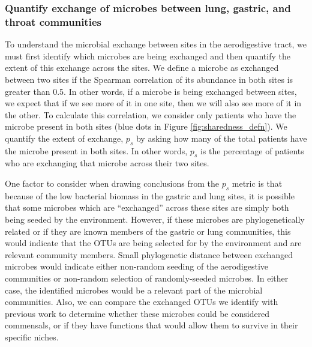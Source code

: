 \documentclass[12pt]{article}
\begin{document}
\subsubsection{Quantify exchange of microbes between lung, gastric, and throat communities} \label{sec:exchange}

To understand the microbial exchange between sites in the 
aerodigestive tract, we must first identify which microbes are being exchanged
and then quantify the extent of this exchange across the sites. 
We define a microbe as exchanged between two sites if the Spearman 
correlation of its abundance in both sites is greater than 0.5.
In other words, if a microbe is being exchanged between sites, we expect that if we see 
more of it in one site, then we will also see more of it in the other. 
To calculate this correlation, we consider only patients who have the microbe present in both sites (blue dots in Figure \ref{fig:sharedness_defn}).
We quantify the extent of exchange, $p_s$ by asking how many of the total patients
have the microbe present in both sites. In other words, $p_s$ is the 
percentage of patients who are exchanging that microbe across their two sites.

One factor to consider when drawing conclusions from the $p_s$ metric 
is that because of the low bacterial biomass in the gastric and lung 
sites, it is possible that some microbes which are ``exchanged'' across 
these sites are simply both being seeded by the environment. However, 
if these microbes are phylogenetically related or if they are known 
members of the gastric or lung communities, this would indicate that 
the OTUs are being selected for by the environment and are relevant 
community members. Small phylogenetic distance between exchanged microbes
would indicate either non-random seeding of the aerodigestive communities 
or non-random selection of randomly-seeded microbes. In either case, the
identified microbes would be a relevant part of the microbial communities.
Also, we can compare the exchanged OTUs we identify with previous work
to determine whether these microbes could be considered commensals, or
if they have functions that would allow them to survive in their specific niches.
\end{document}
